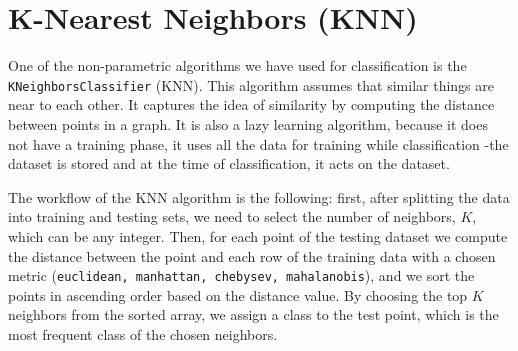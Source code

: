 \section{K-Nearest Neighbors (KNN)}

One of the non-parametric algorithms we have used for classification is the \texttt{KNeighborsClassifier} (KNN). This algorithm assumes that similar things are near to each other.  It captures the idea of similarity by computing the distance between points in a graph.  It is also a lazy learning algorithm, because it does not have a training phase, it uses all the data for training while classification -the dataset is stored and at the time of classification, it acts on the dataset. 

The workflow of the KNN algorithm is the following: first,  after splitting the data into training and testing sets, we need to select the number of neighbors, $K$,  which can be any integer.  Then, for each point of the testing dataset we compute the distance between the point and each row of the training data with a chosen metric (\texttt{euclidean, manhattan, chebysev, mahalanobis}), and we sort the points in ascending order based on the distance value.  By choosing the top $K$ neighbors from the sorted array, we assign a class to the test point, which is the most frequent class of the chosen neighbors.
